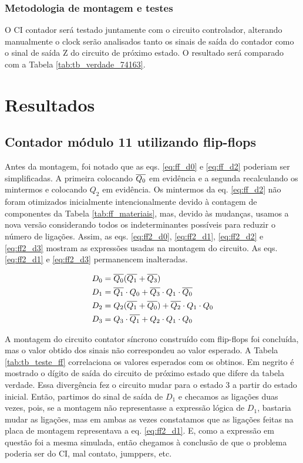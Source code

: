 \documentclass[a4,12pt]{horizon-theme}
\begin{document}
\subsubsection{Metodologia de montagem e testes}
\label{sec:plan_74163_montagem}

O CI contador será testado juntamente com o circuito controlador, alterando manualmente o clock serão analisados tanto os sinais de saída do contador como o sinal de saída Z do circuito de próximo estado. O resultado será comparado com a Tabela \ref{tab:tb_verdade_74163}.

\section{Resultados}
\subsection{Contador módulo 11 utilizando flip-flops}
Antes da montagem, foi notado que as eqs. \eqref{eq:ff_d0} e \eqref{eq:ff_d2} poderiam ser simplificadas. A primeira colocando $\overline{Q_0}$ em evidência e a segunda recalculando os mintermos e colocando $Q_2$ em evidência. Os mintermos da eq. \eqref{eq:ff_d2} não foram otimizados inicialmente intencionalmente devido à contagem de componentes da Tabela \ref{tab:ff_materiais}, mas, devido às mudanças, usamos a nova versão considerando todos os indeterminantes possíveis para reduzir o número de ligações. Assim, as eqs. \eqref{eq:ff2_d0}, \eqref{eq:ff2_d1}, \eqref{eq:ff2_d2} e \eqref{eq:ff2_d3} mostram as expressões usadas na montagem do circuito. As eqs. \eqref{eq:ff2_d1} e \eqref{eq:ff2_d3} permanencem inalteradas.

\begin{align}
  D_0 & = \overline{Q_0}(\overline{Q_1} + \overline{Q_3})\label{eq:ff2_d0}                           \\
  D_1 & = \overline{Q_1} \cdot Q_0 + \overline{Q_3} \cdot Q_1 \cdot \overline{Q_0}\label{eq:ff2_d1}  \\
  D_2 & = Q_2(\overline{Q_1} + \overline{Q_0}) + \overline{Q_2} \cdot Q_1 \cdot Q_0\label{eq:ff2_d2} \\
  D_3 & = Q_3 \cdot \overline{Q_1} + Q_2 \cdot Q_1 \cdot Q_0\label{eq:ff2_d3}
\end{align}

A montagem do circuito contator síncrono construído com flip-flops foi concluída, mas o valor obtido dos sinais não correspondeu ao valor esperado. A Tabela \ref{tab:tb_teste_ff} correlaciona os valores esperados com os obtinos. Em negrito é mostrado o dígito de saída do circuito de próximo estado que difere da tabela verdade. Essa divergência fez o circuito mudar para o estado 3 a partir do estado inicial. Então, partimos do sinal de saída de $D_1$ e checamos as ligações duas vezes, pois, se a montagem não representasse a expressão lógica de $D_1$, bastaria mudar as ligações, mas em ambas as vezes constatamos que as ligações feitas na placa de montagem representava a eq. \eqref{eq:ff2_d1}. E, como a expressão em questão foi a mesma simulada, então chegamos à conclusão de que o problema poderia ser do CI, mal contato, jumppers, etc.
\end{document}
